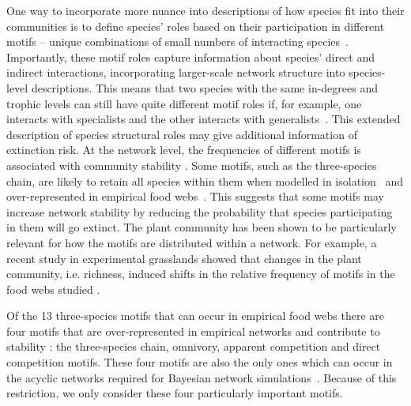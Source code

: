 \documentclass[12pt]{article}
\begin{document}
\begin{spacing}{2.0}
    
    One way to incorporate more nuance into descriptions of how species fit into their communities is to define species' roles based on their participation in different motifs -- unique combinations of small numbers of interacting species~\citep{Stouffer2007,Stouffer2012}. Importantly, these motif roles capture information about species' direct and indirect interactions, incorporating larger-scale network structure into species-level descriptions. 
    This means that two species with the same in-degrees and trophic levels can still have quite different motif roles if, for example, one interacts with specialists and the other interacts with generalists~\citep{Cirtwill2018FoodWebs}. This extended description of species structural roles may give additional information of extinction risk. 
    At the network level, the frequencies of different motifs is associated with community stability \citep{prill2005dynamic, bascompte2005simple}.
    Some motifs, such as the three-species chain, are likely to retain all species within them when modelled in isolation~\citep{Borrelli2015a} and over-represented in empirical food webs~\citep{Stouffer2007}.
    This suggests that some motifs may increase network stability by reducing the probability that species participating in them will go extinct.
    The plant community has been shown to be particularly relevant for how the motifs are distributed within a network. For example, a recent study in experimental grasslands showed that changes in the plant community, i.e. richness, induced shifts in the relative frequency of motifs in the food webs studied \cite{giling2019plant}. 
    
    Of the 13 three-species motifs that can occur in empirical food webs there are four motifs that are over-represented in empirical networks \citep{Stouffer2007} and contribute to stability \citep{Stouffer2007, Borrelli2015a, giling2019plant}: the three-species chain, omnivory, apparent competition and direct competition motifs.
    These four motifs are also the only ones which can occur in the acyclic networks required for Bayesian network simulations~\citep{Eklof2013}. Because of this restriction, we only consider these four particularly important motifs.  
    

\end{spacing}
\end{document}
